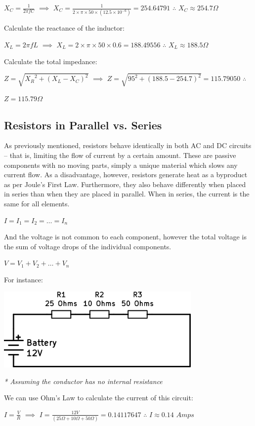 \documentclass[11pt,a4paper]{article}
\begin{document}
$X_C = \frac{1}{2\pi fC}$ $\implies$ $X_C = \frac{1}{2\times \pi \times 50 \times (12.5 \times 10^{-6})} = 254.64791$ $\therefore$ $X_C \approx 254.7 \Omega$

Calculate the reactance of the inductor:

$X_L = 2\pi fL$ $\implies$ $X_L = 2 \times \pi \times 50 \times 0.6 = 188.49556$ $\therefore$ $X_L \approx 188.5 \Omega$

Calculate the total impedance:

$Z = \sqrt{{X_R}^2 + (X_L - X_C)^2}$ $\implies$ $Z = \sqrt{95^2 + (188.5 - 254.7)^2} = 115.79050$ $\therefore$

$Z = 115.79 \Omega$
\subsection{Resistors in Parallel vs. Series}
As previously mentioned, resistors behave identically in both AC and DC circuits -- that is, limiting the flow of current by a certain amount. These are passive components with no moving parts, simply a unique material which slows any current flow. As a disadvantage, however, resistors generate heat as a byproduct as per Joule's First Law. Furthermore, they also behave differently when placed in series than when they are placed in parallel. When in series, the current is the same for all elements.

$I = I_1 = I_2 = \ldots = I_n$

And the voltage is not common to each component, however the total voltage is the sum of voltage drops of the individual components.

$V = V_1 + V_2 + \ldots + V_n$

For instance:

\begin{center}
\includegraphics[width=10cm]{Resistor1.png}\par
\textit{* Assuming the conductor has no internal resistance}
\end{center}
We can use Ohm's Law to calculate the current of this circuit:

$I = \frac{V}{R}$ $\implies$ $I = \frac{12V}{(25\Omega + 10\Omega + 50\Omega)} = 0.14117647$ $\therefore$ $I \approx 0.14$ $Amps$
\end{document}
